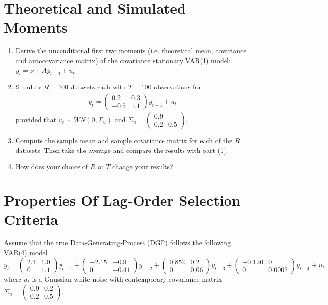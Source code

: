 \documentclass{article}
\begin{document}
\section[Theoretical and Simulated Moments]{Theoretical and Simulated Moments\label{ex:TheoreticalAndSimulatedMoments}}
\begin{enumerate}
 	\item Derive the unconditional first two moments (i.e. theoretical mean, covariance and autocovariance matrix) of the covariance stationary VAR(1) model: $y_t = \nu + A y_{t-1} + u_t$
 	\item Simulate $R=100$ datasets each with $T=100$ observations for
 	\begin{align*}
 	y_t = \begin{pmatrix}0.2 &0.3 \\-0.6 & 1.1 \end{pmatrix} y_{t-1}  + u_t
 	\end{align*}
 	provided that $u_t \sim WN(0,\Sigma_u)$ and $\Sigma_u = \begin{pmatrix}0.9 &  \\ 0.2 & 0.5 \end{pmatrix}$.
	\item Compute the sample mean and sample covariance matrix for each of the $R$ datasets. 
	Then take the average and compare the results with part (1).
	\item How does your choice of $R$ or $T$ change your results?
	
\end{enumerate}

\newpage


\section{Properties Of Lag-Order Selection Criteria}
Assume that the true Data-Generating-Process (DGP) follows the following VAR(4) model
$$y_t = \begin{pmatrix}
2.4 & 1.0\\
0 & 1.1
\end{pmatrix}
y_{t-1}+
\begin{pmatrix}
-2.15 & -0.9\\
0 & -0.41
\end{pmatrix}
y_{t-2}+
\begin{pmatrix}
0.852 & 0.2\\
0& 0.06
\end{pmatrix}
y_{t-3}+
\begin{pmatrix}
-0.126 & 0\\
0 & 0.0003
\end{pmatrix}
y_{t-4}
+ u_t$$
where $u_t$ is a Gaussian white noise with contemporary covariance matrix $\Sigma_u = \begin{pmatrix}
0.9&0.2\\0.2&0.5
\end{pmatrix}$.
\end{document}
